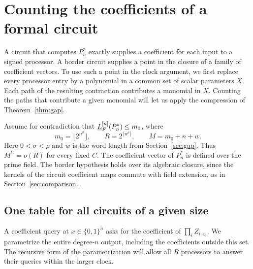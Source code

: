 \section{Counting the coefficients of a formal circuit}\label{sec:parse}

A circuit that computes $P_n^*$ exactly supplies a coefficient for each
input to a signed processor. A border circuit supplies a point in the
closure of a family of coefficient vectors. To use such a point in the
clock argument, we first replace every processor entry by a polynomial
in a common set of scalar parameters $X$. Each path of the resulting
contraction contributes a monomial in $X$. Counting the paths that
contribute a given monomial will let us apply the compression of
Theorem~\ref{thm:gap}.

Assume for contradiction that $\underline L_F^{[n]}(P_n^*)\le m_0$, where
\[
 m_0=\lfloor 2^{n^\sigma}\rfloor,\qquad
 R=2^{\lceil n^\rho\rceil},\qquad M=m_0+n+w .
\]
Here $0<\sigma<\rho$ and $w$ is the word length from
Section~\ref{sec:gap}. Thus $M^C=o(R)$ for every fixed $C$.
The coefficient vector of $P_n^*$ is defined over the prime field.
The border hypothesis holds over its algebraic closure, since the
kernels of the circuit coefficient maps commute with field extension,
as in Section~\ref{sec:comparison}.

\subsection{One table for all circuits of a given size}
A coefficient query at $x\in\{0,1\}^n$ asks for the coefficient of
$\prod_i Z_{i,x_i}$. We parametrize the entire degree-$n$ output,
including the coefficients outside this set. The recursive form of the
parametrization will allow all $R$ processors to answer their queries
within the larger clock.


